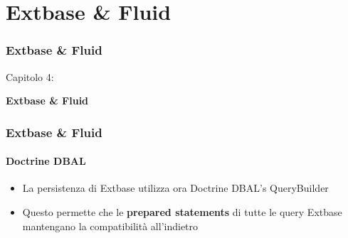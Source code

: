 %

\section{Extbase \& Fluid}
\begin{frame}[fragile]
	\frametitle{Extbase \& Fluid}

	\begin{center}\huge{Capitolo 4:}\end{center}
	\begin{center}\huge{\color{typo3darkgrey}\textbf{Extbase \& Fluid}}\end{center}

\end{frame}


\begin{frame}[fragile]
	\frametitle{Extbase \& Fluid}
	\framesubtitle{Doctrine DBAL}

	\begin{itemize}

		\item La persistenza di Extbase utilizza ora Doctrine DBAL's QueryBuilder
		\item Questo permette che le \textbf{prepared statements} di tutte le query Extbase mantengano la compatibilità all'indietro

	\end{itemize}

\end{frame}


